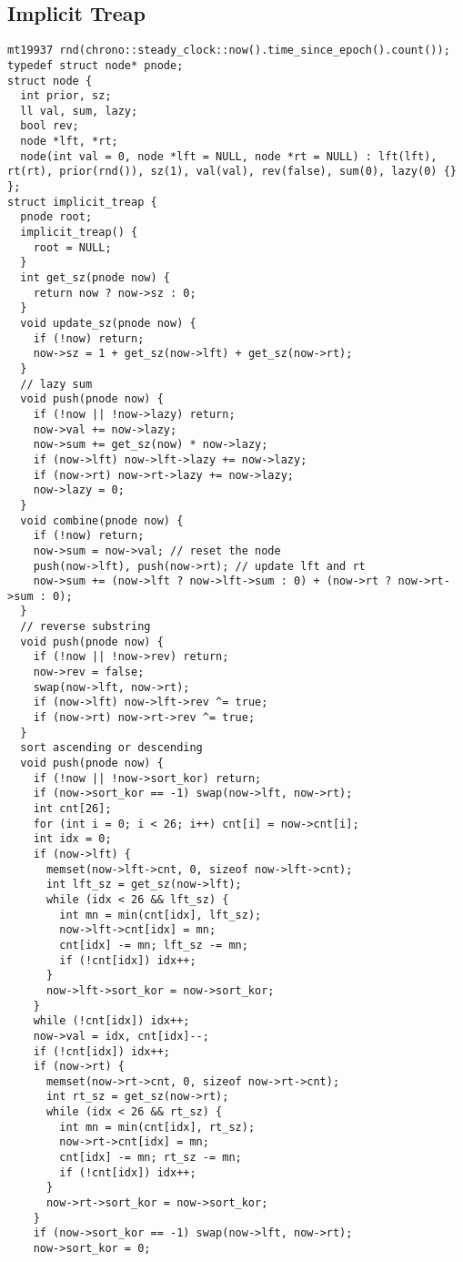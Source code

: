 \documentclass[FSZ,a4paper,onesided]{article}
\begin{document}
\begin{multicols*}{\COLS}
\subsection{Implicit Treap}
\begin{lstlisting}
mt19937 rnd(chrono::steady_clock::now().time_since_epoch().count());
typedef struct node* pnode;
struct node {
  int prior, sz;
  ll val, sum, lazy;
  bool rev;
  node *lft, *rt;
  node(int val = 0, node *lft = NULL, node *rt = NULL) : lft(lft), rt(rt), prior(rnd()), sz(1), val(val), rev(false), sum(0), lazy(0) {}
};
struct implicit_treap {
  pnode root;
  implicit_treap() {
    root = NULL;
  }
  int get_sz(pnode now) {
    return now ? now->sz : 0;
  }
  void update_sz(pnode now) {
    if (!now) return;
    now->sz = 1 + get_sz(now->lft) + get_sz(now->rt);
  }
  // lazy sum
  void push(pnode now) {
    if (!now || !now->lazy) return;
    now->val += now->lazy;
    now->sum += get_sz(now) * now->lazy;
    if (now->lft) now->lft->lazy += now->lazy;
    if (now->rt) now->rt->lazy += now->lazy;
    now->lazy = 0;
  }
  void combine(pnode now) {
    if (!now) return;
    now->sum = now->val; // reset the node
    push(now->lft), push(now->rt); // update lft and rt
    now->sum += (now->lft ? now->lft->sum : 0) + (now->rt ? now->rt->sum : 0);
  }
  // reverse substring
  void push(pnode now) {
    if (!now || !now->rev) return;
    now->rev = false;
    swap(now->lft, now->rt);
    if (now->lft) now->lft->rev ^= true;
    if (now->rt) now->rt->rev ^= true;
  }
  sort ascending or descending
  void push(pnode now) {
    if (!now || !now->sort_kor) return;
    if (now->sort_kor == -1) swap(now->lft, now->rt);
    int cnt[26];
    for (int i = 0; i < 26; i++) cnt[i] = now->cnt[i];
    int idx = 0;
    if (now->lft) {
      memset(now->lft->cnt, 0, sizeof now->lft->cnt);
      int lft_sz = get_sz(now->lft);
      while (idx < 26 && lft_sz) {
        int mn = min(cnt[idx], lft_sz);
        now->lft->cnt[idx] = mn;
        cnt[idx] -= mn; lft_sz -= mn;
        if (!cnt[idx]) idx++;
      }
      now->lft->sort_kor = now->sort_kor;
    }
    while (!cnt[idx]) idx++;
    now->val = idx, cnt[idx]--;
    if (!cnt[idx]) idx++;
    if (now->rt) {
      memset(now->rt->cnt, 0, sizeof now->rt->cnt);
      int rt_sz = get_sz(now->rt);
      while (idx < 26 && rt_sz) {
        int mn = min(cnt[idx], rt_sz);
        now->rt->cnt[idx] = mn;
        cnt[idx] -= mn; rt_sz -= mn;
        if (!cnt[idx]) idx++;
      }
      now->rt->sort_kor = now->sort_kor;
    }
    if (now->sort_kor == -1) swap(now->lft, now->rt);
    now->sort_kor = 0;

\end{lstlisting}
\end{multicols*}
\end{document}
